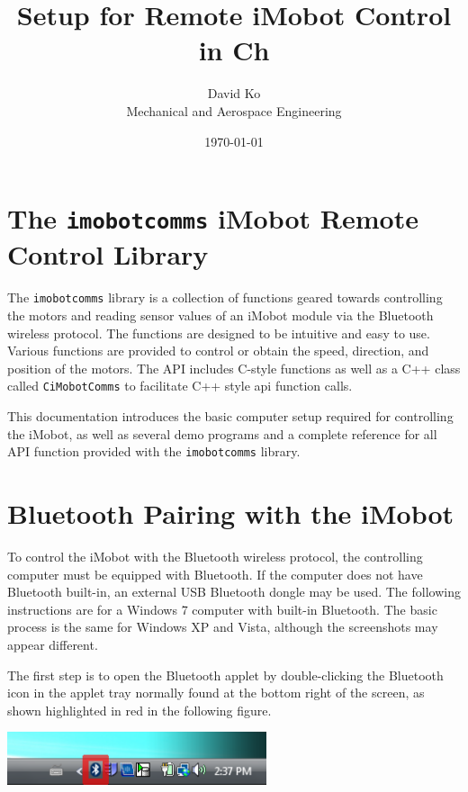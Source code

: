 \documentclass{article}
\begin{document}
\title{Setup for Remote iMobot Control in Ch}  
\author{David Ko\\Mechanical and Aerospace Engineering}
\date{\today} 
\maketitle

\section{The \texttt{imobotcomms} iMobot Remote Control Library}
The \texttt{imobotcomms} library is a collection of functions geared towards
controlling the motors and reading sensor values of an iMobot module via the
Bluetooth wireless protocol. The functions are designed to be intuitive
and easy to use. Various functions are provided to control or obtain the speed,
direction, and position of the motors. The API includes C-style functions as well
as a C++ class called \texttt{CiMobotComms} to facilitate C++ style api function
calls. 

This documentation introduces the basic computer setup required for controlling 
the iMobot, as well as several demo programs and a complete reference for all
API function provided with the \texttt{imobotcomms} library.

\section{Bluetooth Pairing with the iMobot}
To control the iMobot with the Bluetooth wireless protocol, the controlling 
computer must be equipped with Bluetooth. If the computer does not have
Bluetooth built-in, an external USB Bluetooth dongle may be used. The following
instructions are for a Windows 7 computer with built-in Bluetooth. The basic
process is the same for Windows XP and Vista, although the screenshots may
appear different. 

The first step is to open the Bluetooth applet by double-clicking the Bluetooth
icon in the applet tray normally found at the bottom right of the screen, as
shown highlighted in red in the following figure.

\begin{center}
\includegraphics[width=3in]{images/imobot_connect_1.png}
\end{center}
\end{document}
